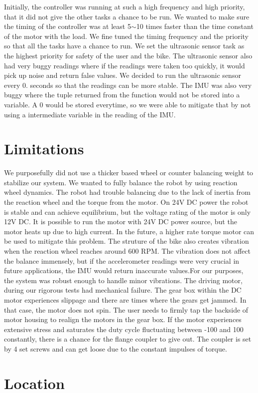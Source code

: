 Initially, the controller was running at such a high frequency and high priority, that it did not give the other tasks a chance to be run. We wanted to make sure the timing of the controller was at least 5$\sim$10 times faster than the time constant of the motor with the load. We fine tuned the timing frequency and the priority so that all the tasks have a chance to run. We set the ultrasonic sensor task as the highest priority for safety of the user and the bike. The ultrasonic sensor also had very buggy readings where if the readings were taken too quickly, it would pick up noise and return false values. We decided to run the ultrasonic sensor every 0. seconds so that the readings can be more stable. The I\+MU was also very buggy where the tuple returned from the function would not be stored into a variable. A 0 would be stored everytime, so we were able to mitigate that by not using a intermediate variable in the reading of the I\+MU.\hypertarget{index_sec_lim}{}\section{Limitations}\label{index_sec_lim}
We purposefully did not use a thicker based wheel or counter balancing weight to stabilize our system. We wanted to fully balance the robot by using reaction wheel dynamics. The robot had trouble balancing due to the lack of inertia from the reaction wheel and the torque from the motor. On 24V DC power the robot is stable and can achieve equilibrium, but the voltage rating of the motor is only 12V DC. It is possible to run the motor with 24V DC power source, but the motor heats up due to high current. In the future, a higher rate torque motor can be used to mitigate this problem. The struture of the bike also creates vibration when the reaction wheel reaches around 600 R\+PM. The vibration does not affect the balance immensely, but if the accelerometer readings were very crucial in future applications, the I\+MU would return inaccurate values.\+For our purposes, the system was robust enough to handle minor vibrations. The driving motor, during our rigorous tests had mechanical failure. The gear box within the DC motor experiences slippage and there are times where the gears get jammed. In that case, the motor does not spin. The user needs to firmly tap the backside of motor housing to realign the motors in the gear box. If the motor experiences extensive stress and saturates the duty cycle fluctuating between -\/100 and 100 constantly, there is a chance for the flange coupler to give out. The coupler is set by 4 set screws and can get loose due to the constant impulses of torque.\hypertarget{index_sec_loc}{}\section{Location}\label{index_sec_loc}
